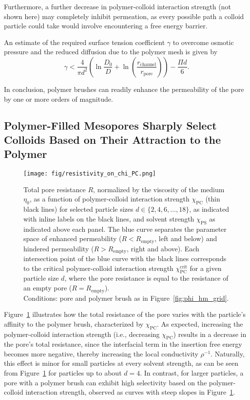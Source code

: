 \documentclass[12pt, a4paper]{article}
\begin{document}
Furthermore, a further decrease in polymer-colloid interaction strength (not shown here) may completely inhibit permeation, as every possible path a colloid particle could take would involve encountering a free energy barrier.

An estimate of the required surface tension coefficient $\gamma$ to overcome osmotic pressure and the reduced diffusion due to the polymer mesh is given by
\begin{equation}
\gamma < \frac{4}{\pi d^2} \left( \ln\frac{D_0}{D} + \ln\left( \frac{r_{\textrm{channel}}}{r_{\textrm{pore}}} \right) \right) - \frac{\Pi d}{6}.
\end{equation}

In conclusion, polymer brushes can readily enhance the permeability of the pore by one or more orders of magnitude.

\subsection{Polymer-Filled Mesopores Sharply Select Colloids Based on Their Attraction to the Polymer}
\begin{figure}
    \centering
    \texttt{[image: fig/resistivity\_on\_chi\_PC.png]}
    \caption{
        Total pore resistance $R$, normalized by the viscosity of the medium $\eta_0$, as a function of polymer-colloid interaction strength $\chi_{\textrm{PC}}$ (thin black lines) for selected particle sizes $d \in \{2, 4, 6, \dots, 18\}$, as indicated with inline labels on the black lines, and solvent strength $\chi_{\textrm{PS}}$ as indicated above each panel.
        The blue curve separates the parameter space of enhanced permeability ($R < R_{\textrm{empty}}$, left and below) and hindered permeability ($R > R_{\textrm{empty}}$, right and above).
        Each intersection point of the blue curve with the black lines corresponds to the critical polymer-colloid interaction strength $\chi_{\textrm{PC}}^{\textrm{crit}}$ for a given particle size $d$, where the pore resistance is equal to the resistance of an empty pore ($R = R_{\textrm{empty}}$).
        \\
        Conditions: pore and polymer brush as in Figure~\ref{fig:phi_hm_grid}.
    }
    \label{fig:R_vs_chi_PC}
\end{figure}

Figure~\ref{fig:R_vs_chi_PC} illustrates how the total resistance of the pore varies with the particle's affinity to the polymer brush, characterized by $\chi_{\textrm{PC}}$.
As expected, increasing the polymer-colloid interaction strength (i.e., decreasing $\chi_{\textrm{PC}}$) results in a decrease in the pore's total resistance, since the interfacial term in the insertion free energy becomes more negative, thereby increasing the local conductivity $\rho^{-1}$.
Naturally, this effect is minor for small particles at every solvent strength, as can be seen from Figure~\ref{fig:R_vs_chi_PC} for particles up to about $d = 4$.
In contrast, for larger particles, a pore with a polymer brush can exhibit high selectivity based on the polymer-colloid interaction strength, observed as curves with steep slopes in Figure~\ref{fig:R_vs_chi_PC}.
\end{document}
